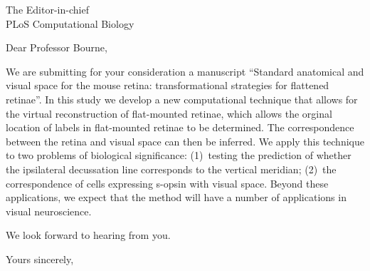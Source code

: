 \documentclass[IANC,11pt]{infletr}
\begin{document}
\begin{letter}{The Editor-in-chief\\
    PLoS Computational Biology
}

\opening{Dear Professor Bourne,}

We are submitting for your consideration a manuscript ``Standard
anatomical and visual space for the mouse retina: transformational
strategies for flattened retinae''.  In this study we develop a new
computational technique that allows for the virtual reconstruction of
flat-mounted retinae, which allows the orginal location of labels in
flat-mounted retinae to be determined. The correspondence between the
retina and visual space can then be inferred. We apply this technique
to two problems of biological significance: (1)~testing the
prediction of whether the ipsilateral decussation line corresponds to
the vertical meridian; (2)~the correspondence of cells expressing
s-opsin with visual space. Beyond these applications, we expect that
the method will have a number of applications in visual neuroscience.

We look forward to hearing from you.

\closing{Yours sincerely,}

\end{letter}
\end{document}
